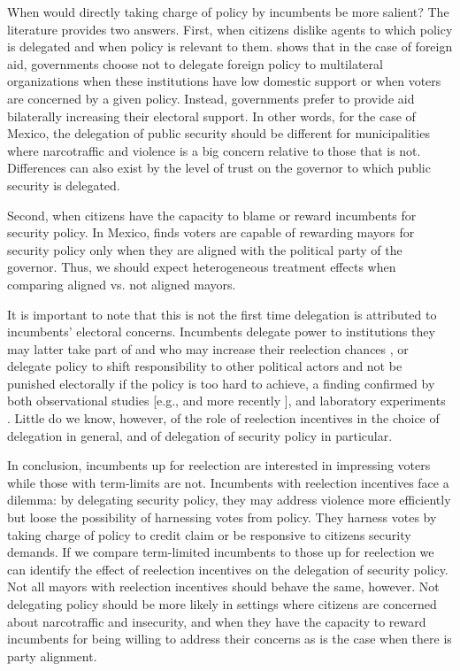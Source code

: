 \documentclass[12pt]{amsart}
\numberwithin{equation}{section}
\theoremstyle{definition}
\theoremstyle{definition}
\theoremstyle{definition}
\begin{document}
When would directly taking charge of policy by incumbents be more salient? The literature provides two answers. First, when citizens dislike agents to which policy is delegated and when policy is relevant to them. \citet{milner_2004} shows that in the case of foreign aid, governments choose not to delegate foreign policy to multilateral organizations when these institutions have low domestic support or when voters are concerned by a given policy. Instead, governments prefer to provide aid bilaterally increasing their electoral support. In other words, for the case of Mexico, the delegation of public security should be different for municipalities where narcotraffic and violence is a big concern relative to those that is not. Differences can also exist by the level of trust on the governor to which public security is delegated.

Second, when citizens have the capacity to blame or reward incumbents for security policy. In Mexico, \citet{ley_2017} finds voters are capable of rewarding mayors for security policy only when they are aligned with the political party of the governor. Thus, we should expect heterogeneous treatment effects when comparing aligned vs. not aligned mayors.

It is important to note that this is not the first time delegation is attributed to incumbents' electoral concerns. Incumbents delegate power to institutions they may latter take part of and who may increase their reelection chances \citep{mccubbins_1991}, or delegate policy to shift responsibility to other political actors and not be punished electorally if the policy is too hard to achieve, a finding confirmed by both observational studies [e.g., \citet{fiorina_1982} and more recently \citep{loftis_2014}],  and laboratory experiments \citep{bartling_fischbacher_2012}. Little do we know, however, of the role of reelection incentives in the choice of delegation in general, and of delegation of security policy in particular. 

In conclusion, incumbents up for reelection are interested in impressing voters while those with term-limits are not. Incumbents with reelection incentives face a dilemma: by delegating security policy, they may address violence more efficiently but loose the possibility of harnessing votes from policy. They harness votes by taking charge of policy to credit claim or be responsive to citizens security demands. If we compare term-limited incumbents to those up for reelection we can identify the effect of reelection incentives on the delegation of security policy. Not all mayors with reelection incentives should behave the same, however. Not delegating policy should be more likely in settings where citizens are concerned about narcotraffic and insecurity, and when they have the capacity to reward incumbents for being willing to address their concerns as is the case when there is party alignment. 
\end{document}
